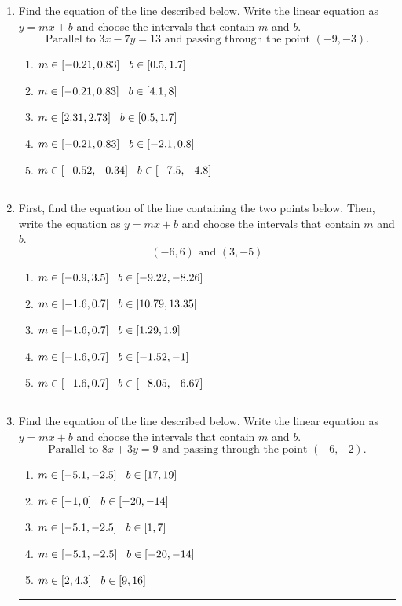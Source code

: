 \documentclass[14pt]{extbook}
\newcommand{\litem}[1]{\item#1\hspace*{-1cm}\rule{\textwidth}{0.4pt}}
\begin{document}
\begin{enumerate}
{\begin{enumerate}[label=\Alph*.]
\end{enumerate} }
\litem{
Find the equation of the line described below. Write the linear equation as $ y=mx+b $ and choose the intervals that contain $m$ and $b$.\[ \text{Parallel to } 3 x - 7 y = 13 \text{ and passing through the point } (-9, -3). \]\begin{enumerate}[label=\Alph*.]
\item \( m \in [-0.21, 0.83] \hspace*{3mm} b \in [0.5, 1.7] \)
\item \( m \in [-0.21, 0.83] \hspace*{3mm} b \in [4.1, 8] \)
\item \( m \in [2.31, 2.73] \hspace*{3mm} b \in [0.5, 1.7] \)
\item \( m \in [-0.21, 0.83] \hspace*{3mm} b \in [-2.1, 0.8] \)
\item \( m \in [-0.52, -0.34] \hspace*{3mm} b \in [-7.5, -4.8] \)

\end{enumerate} }
\litem{
First, find the equation of the line containing the two points below. Then, write the equation as $ y=mx+b $ and choose the intervals that contain $m$ and $b$.\[ (-6, 6) \text{ and } (3, -5) \]\begin{enumerate}[label=\Alph*.]
\item \( m \in [-0.9, 3.5] \hspace*{3mm} b \in [-9.22, -8.26] \)
\item \( m \in [-1.6, 0.7] \hspace*{3mm} b \in [10.79, 13.35] \)
\item \( m \in [-1.6, 0.7] \hspace*{3mm} b \in [1.29, 1.9] \)
\item \( m \in [-1.6, 0.7] \hspace*{3mm} b \in [-1.52, -1] \)
\item \( m \in [-1.6, 0.7] \hspace*{3mm} b \in [-8.05, -6.67] \)

\end{enumerate} }
\litem{
Find the equation of the line described below. Write the linear equation as $ y=mx+b $ and choose the intervals that contain $m$ and $b$.\[ \text{Parallel to } 8 x + 3 y = 9 \text{ and passing through the point } (-6, -2). \]\begin{enumerate}[label=\Alph*.]
\item \( m \in [-5.1, -2.5] \hspace*{3mm} b \in [17, 19] \)
\item \( m \in [-1, 0] \hspace*{3mm} b \in [-20, -14] \)
\item \( m \in [-5.1, -2.5] \hspace*{3mm} b \in [1, 7] \)
\item \( m \in [-5.1, -2.5] \hspace*{3mm} b \in [-20, -14] \)
\item \( m \in [2, 4.3] \hspace*{3mm} b \in [9, 16] \)


\end{enumerate}}
\end{enumerate}
\end{document}
